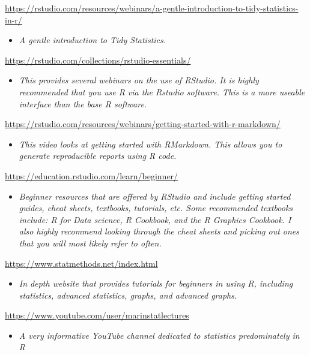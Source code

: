 \documentclass[
]{book}
\providecommand{\tightlist}{%
  \setlength{\itemsep}{0pt}\setlength{\parskip}{0pt}}
\begin{document}
\url{https://rstudio.com/resources/webinars/a-gentle-introduction-to-tidy-statistics-in-r/}

\begin{itemize}
\tightlist
\item
  \emph{A gentle introduction to Tidy Statistics.}
\end{itemize}

\url{https://rstudio.com/collections/rstudio-essentials/}

\begin{itemize}
\tightlist
\item
  \emph{This provides several webinars on the use of RStudio. It is highly recommended that you use R via the Rstudio software. This is a more useable interface than the base R software.}
\end{itemize}

\url{https://rstudio.com/resources/webinars/getting-started-with-r-markdown/}

\begin{itemize}
\tightlist
\item
  \emph{This video looks at getting started with RMarkdown. This allows you to generate reproducible reports using R code.}
\end{itemize}

\url{https://education.rstudio.com/learn/beginner/}

\begin{itemize}
\tightlist
\item
  \emph{Beginner resources that are offered by RStudio and include getting started guides, cheat sheets, textbooks, tutorials, etc. Some recommended textbooks include: R for Data science, R Cookbook, and the R Graphics Cookbook. I also highly recommend looking through the cheat sheets and picking out ones that you will most likely refer to often.}
\end{itemize}

\url{https://www.statmethods.net/index.html}

\begin{itemize}
\tightlist
\item
  \emph{In depth website that provides tutorials for beginners in using R, including statistics, advanced statistics, graphs, and advanced graphs. }
\end{itemize}

\url{https://www.youtube.com/user/marinstatlectures}

\begin{itemize}
\tightlist
\item
  \emph{A very informative YouTube channel dedicated to statistics predominately in R }
\end{itemize}
\end{document}
